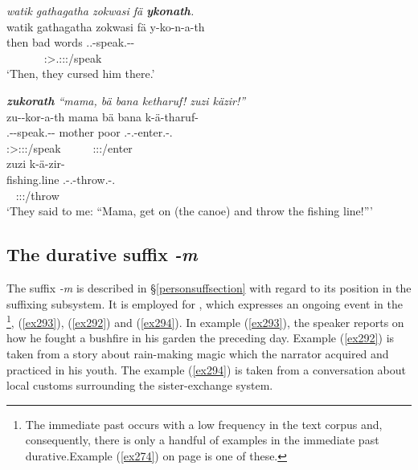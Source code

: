 \begin{exe}
	\ex \emph{watik gathagatha zokwasi fä \textbf{ykonath}.}\\
	\glll watik {gathagatha} zokwasi fä y-ko-n-a-th\\
	then {bad} words {\Dist} \Tsg.\Masc.\Alph-speak.\Ext-\Du-\Stnsg{}\\
	~ ~ ~ ~ {\footnotesize \Stdu:\Sbj>\Tsg.\Masc:\Obj:\Pst:\Ipfv/speak}\\
	\trans `Then, they cursed him there.' 
	\label{ex290}
\end{exe}
\begin{exe}
	\ex \emph{\textbf{zukorath} ``mama, bä bana ketharuf! zuzi käzir!''}\\
	\glll zu-\Zero{}-kor-a-th mama bä bana k-ä-tharuf-\Zero{}\\
	\Fsg.\Gam-\Du-speak.\Rs-\Pst-\Stnsg{} mother \Ssg{} poor \M.\Bet-\Vc.\Ndu-enter.\Rs-\Ssg.{\Imp}\\
	{\footnotesize \Stdu:\Sbj>\Fsg:\Obj:\Pst:\Pfv/speak} ~ ~ ~ {\footnotesize \Ssg:\Sbj:\Imp:\Pfv/enter}\\
	\sn
	\glll zuzi k-ä-zir-\Zero\\
	fishing.line \M.\Bet-\Vc.\Ndu-throw.\Rs-\Ssg.{\Imp}\\
	~ {\footnotesize \Ssg:\Sbj:\Imp:\Pfv/throw}\\
	\trans `They said to me: ``Mama, get on (the canoe) and throw the fishing line!'''\\ 
	\label{ex291}
\end{exe}

\subsection{The durative suffix \emph{-m}}\label{durativesuffixm}

The  suffix \emph{-m} is described in {\S}\ref{personsuffsection} with regard to its position in the suffixing subsystem. It is employed for  , which expresses an ongoing event in the \footnote{The immediate past occurs with a low frequency in the text corpus and, consequently, there is only a handful of examples in the immediate past durative.\footnotesize Example (\ref{ex274}) on page \pageref{ex274} is one of these.},  (\ref{ex293}),  (\ref{ex292}) and  (\ref{ex294}). In example (\ref{ex293}), the speaker reports on how he fought a bushfire in his garden the preceding day. Example (\ref{ex292}) is taken from a story about rain-making magic which the narrator acquired and practiced in his youth. The  example (\ref{ex294}) is taken from a conversation about local customs surrounding the sister-exchange system.

